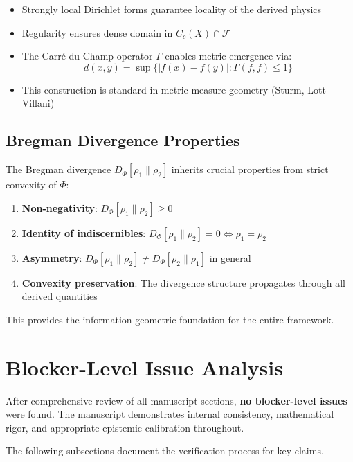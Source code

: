 \documentclass[11pt,a4paper]{article}
\newenvironment{auditstatus}[1]{%
    \begin{tcolorbox}[colback=green!5!white,colframe=green!75!black,title=#1]
}{\end{tcolorbox}}
\theoremstyle{definition}
\begin{document}
\begin{itemize}
    \item Strongly local Dirichlet forms guarantee locality of the derived physics
    \item Regularity ensures dense domain in $C_c(X) \cap \mathcal{F}$
    \item The Carré du Champ operator $\Gamma$ enables metric emergence via:
    \begin{equation}
        d(x,y) = \sup\{|f(x) - f(y)| : \Gamma(f,f) \leq 1\}
    \end{equation}
    \item This construction is standard in metric measure geometry (Sturm, Lott-Villani)
\end{itemize}

\subsection{Bregman Divergence Properties}

The Bregman divergence $D_\Phi[\rho_1 \| \rho_2]$ inherits crucial properties from strict convexity of $\Phi$:

\begin{enumerate}
    \item \textbf{Non-negativity}: $D_\Phi[\rho_1 \| \rho_2] \geq 0$
    \item \textbf{Identity of indiscernibles}: $D_\Phi[\rho_1 \| \rho_2] = 0 \Leftrightarrow \rho_1 = \rho_2$
    \item \textbf{Asymmetry}: $D_\Phi[\rho_1 \| \rho_2] \neq D_\Phi[\rho_2 \| \rho_1]$ in general
    \item \textbf{Convexity preservation}: The divergence structure propagates through all derived quantities
\end{enumerate}

This provides the information-geometric foundation for the entire framework.

\section{Blocker-Level Issue Analysis}

\begin{auditstatus}{Result: No Blocker-Level Issues Identified}
After comprehensive review of all manuscript sections, \textbf{no blocker-level issues} were found. The manuscript demonstrates internal consistency, mathematical rigor, and appropriate epistemic calibration throughout.

The following subsections document the verification process for key claims.
\end{auditstatus}
\end{document}
